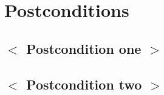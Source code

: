 \documentclass[notitlepage]{article}
\begin{document}

\section{Postconditions}\label{sec:postconditions}

\subsection{$<$ Postcondition one $>$}

\subsection{$<$ Postcondition two $>$}
\end{document}

